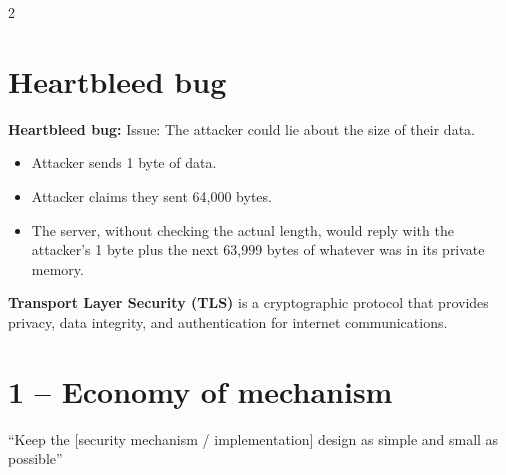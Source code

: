 \documentclass[a4paper,9pt]{extarticle}
\begin{document}

\thispagestyle{fancy}



\begin{multicols}{2}


\section{Heartbleed bug}


\begin{example}

\textbf{Heartbleed bug:} Issue: The attacker could lie about the size of their data.

\begin{itemize}

\item Attacker sends 1 byte of data.

\item Attacker claims they sent 64,000 bytes.

\item The server, without checking the actual length, would reply with the attacker's 1
byte plus the next 63,999 bytes of whatever was in its private memory.

\end{itemize}

\end{example}


\begin{definition}

\textbf{Transport Layer Security (TLS)} is a cryptographic protocol that provides privacy, data integrity, and authentication for internet communications.

\end{definition}



\section{1 -- Economy of mechanism}


\begin{important}

``Keep the [security mechanism / implementation] design as simple and small as possible''

\end{important}



\end{multicols}
\end{document}
